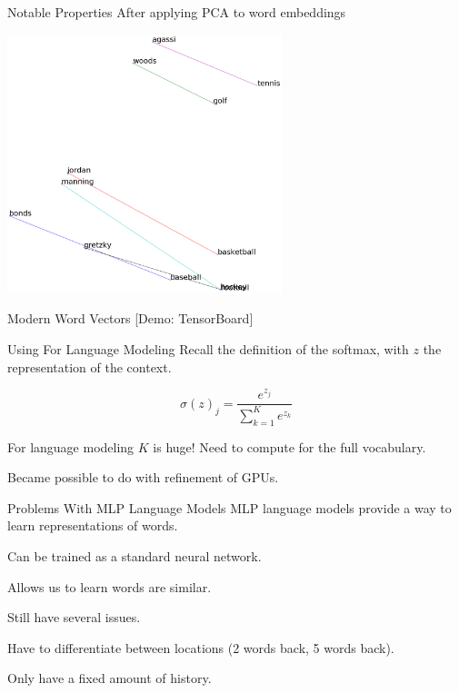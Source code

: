 \documentclass{beamer}
\let\tempone\itemize
\let\temptwo\enditemize
\renewenvironment{itemize}{\tempone\addtolength{\itemsep}{0.5\baselineskip}}{\temptwo}
\newcommand{\air}{\vspace{0.25cm}}
\begin{document}
\begin{frame}{Notable Properties}
  After applying PCA to word embeddings
  \begin{center}
    \includegraphics[width=8cm]{athletes}
  \end{center}
\end{frame}




\begin{frame}{Modern Word Vectors}  
  [Demo: TensorBoard]
\end{frame}


\begin{frame}{Using For Language Modeling}
  Recall the definition of the softmax, with $z$ the representation 
  of the context.

  \[ \sigma(z)_j = \frac{e^{z_j}}{\sum_{k=1}^Ke^{z_{k}}}  \] 

  \air

  For language modeling $K$ is huge! Need to compute for the full
  vocabulary.
  \air

  Became possible to do with refinement of GPUs.
\end{frame}


\begin{frame}{Problems With MLP Language Models}  
  MLP language models provide a way to learn 
  representations of words.

  \begin{itemize}
  \item Can be trained as a standard neural network.
  \item Allows us to learn words are similar. 
  \end{itemize}

  \air

  Still have several \alert{issues}.

  \begin{itemize}
  \item Have to differentiate between locations (2 words back, 5 words back).
  \item Only have a fixed amount of history. 
  \end{itemize}
\end{frame}
\end{document}
